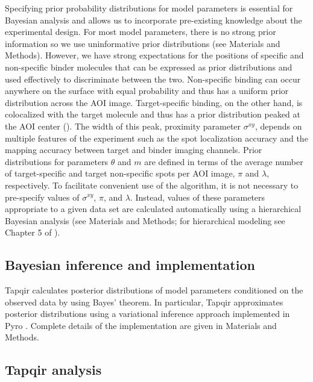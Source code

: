 Specifying prior probability distributions for model parameters is essential for Bayesian analysis and allows us to incorporate pre-existing knowledge about the experimental design. For most model parameters, there is no strong prior information so we use uninformative prior distributions (see Materials and Methods). However, we have strong expectations for the positions of specific and non-specific binder molecules that can be expressed as prior distributions and used effectively to discriminate between the two. Non-specific binding can occur anywhere on the surface with equal probability and thus has a uniform prior distribution across the AOI image. Target-specific binding, on the other hand, is colocalized with the target molecule and thus has a prior distribution peaked at the AOI center (). The width of this peak, proximity parameter $\sigma^{xy}$, depends on multiple features of the experiment such as the spot localization accuracy and the mapping accuracy between target and binder imaging channels. Prior distributions for parameters $\theta$ and $m$ are defined in terms of the average number of target-specific and target non-specific spots per AOI image, $\pi$ and $\lambda$, respectively. To facilitate convenient use of the algorithm, it is not necessary to pre-specify values of $\sigma^{xy}$, $\pi$, and $\lambda$.  Instead, values of these parameters appropriate to a given data set are calculated automatically using a hierarchical Bayesian analysis (see Materials and Methods; for hierarchical modeling see Chapter 5 of \cite{Gelman2013-ro}).

\subsection{Bayesian inference and implementation}

Tapqir calculates posterior distributions of model parameters conditioned on the observed data by using Bayes' theorem. In particular, Tapqir approximates posterior distributions using a variational inference approach implemented in Pyro \citep{Bingham2019-qy}.  Complete details of the implementation are given in Materials and Methods.

\subsection{Tapqir analysis}

